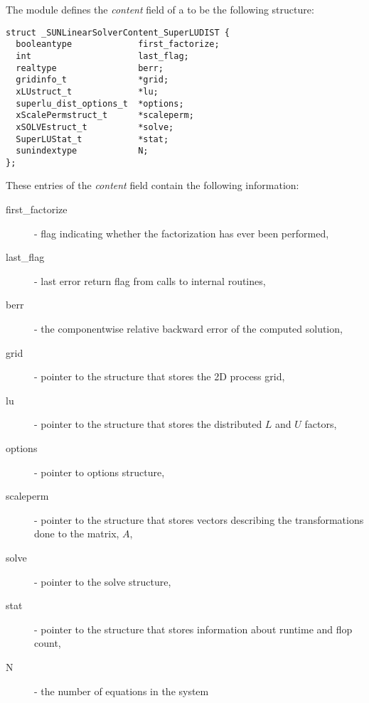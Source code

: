 The {\sunlinsolsludist} module defines the {\em
content} field of a  to be the following structure:
\begin{verbatim}
struct _SUNLinearSolverContent_SuperLUDIST {
  booleantype             first_factorize;
  int                     last_flag;
  realtype                berr;
  gridinfo_t              *grid;
  xLUstruct_t             *lu;
  superlu_dist_options_t  *options;
  xScalePermstruct_t      *scaleperm;
  xSOLVEstruct_t          *solve;
  SuperLUStat_t           *stat;
  sunindextype            N;
};
\end{verbatim}
These entries of the \emph{content} field contain the following
information:
\begin{description}
  \item[first\_factorize] - flag indicating whether the factorization
    has ever been performed,
  \item[last\_flag] - last error return flag from calls to internal routines,
  \item[berr] - the componentwise relative backward error of the computed solution,
  \item[grid] - pointer to the {\superludist} structure that stores the 2D process grid,
  \item[lu] - pointer to the {\superludist} structure that stores the distributed $L$
    and $U$ factors,
  \item[options] - pointer to {\superludist} options structure,
  \item[scaleperm] - pointer to the {\superludist} structure that stores vectors describing
    the transformations done to the matrix, $A$,
  \item[solve] - pointer to the {\superludist} solve structure,
  \item[stat] - pointer to the {\superludist} structure that stores information about runtime
    and flop count,
  \item[N] - the number of equations in the system
\end{description}
